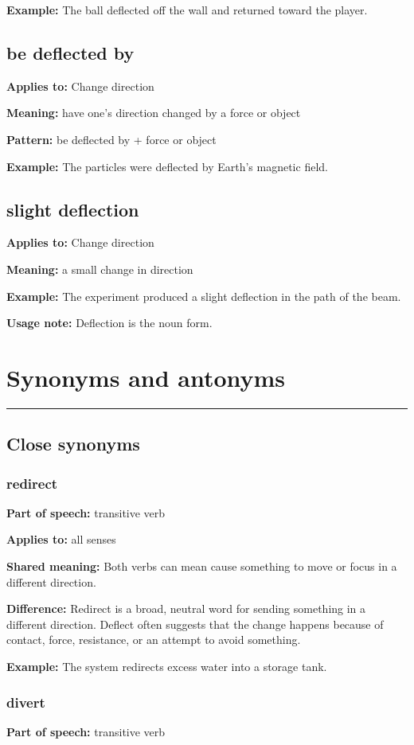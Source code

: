 \documentclass[11pt]{article}
\newcommand{\sectionrule}{\par\vspace{-0.5em}\noindent\textcolor{Accent}{\rule{\linewidth}{0.6pt}}\par}
\begin{document}
\textbf{Example:} The ball deflected off the wall and returned toward the player.

\subsection{be deflected by}
\textbf{Applies to:} Change direction

\textbf{Meaning:} have one's direction changed by a force or object

\textbf{Pattern:} be deflected by + force or object

\textbf{Example:} The particles were deflected by Earth's magnetic field.

\subsection{slight deflection}
\textbf{Applies to:} Change direction

\textbf{Meaning:} a small change in direction

\textbf{Example:} The experiment produced a slight deflection in the path of the beam.

\textbf{Usage note:} Deflection is the noun form.

\section{Synonyms and antonyms}
\sectionrule
\subsection{Close synonyms}
\subsubsection{redirect}
\textbf{Part of speech:} transitive verb

\textbf{Applies to:} all senses

\textbf{Shared meaning:} Both verbs can mean cause something to move or focus in a different direction.

\textbf{Difference:} Redirect is a broad, neutral word for sending something in a different direction. Deflect often suggests that the change happens because of contact, force, resistance, or an attempt to avoid something.

\textbf{Example:} The system redirects excess water into a storage tank.

\subsubsection{divert}
\textbf{Part of speech:} transitive verb
\end{document}
